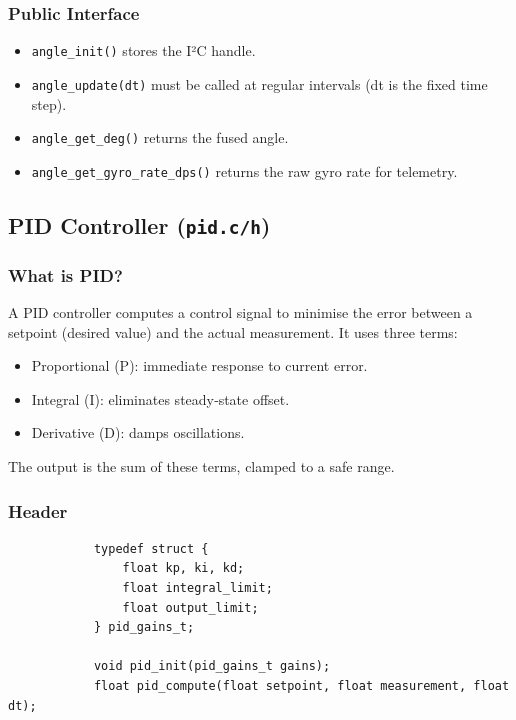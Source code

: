 \documentclass[12pt,a4paper]{article}
\begin{document}
		\subsubsection{Public Interface}
		\begin{itemize}
			\item \texttt{angle\_init()} stores the I²C handle.
			\item \texttt{angle\_update(dt)} must be called at regular intervals (dt is the fixed time step).
			\item \texttt{angle\_get\_deg()} returns the fused angle.
			\item \texttt{angle\_get\_gyro\_rate\_dps()} returns the raw gyro rate for telemetry.
		\end{itemize}
		
		\subsection{PID Controller (\texttt{pid.c/h})}
		\subsubsection{What is PID?}
		A PID controller computes a control signal to minimise the error between a setpoint (desired value) and the actual measurement. It uses three terms:
		\begin{itemize}
			\item Proportional (P): immediate response to current error.
			\item Integral (I): eliminates steady‑state offset.
			\item Derivative (D): damps oscillations.
		\end{itemize}
		The output is the sum of these terms, clamped to a safe range.
		
		\subsubsection{Header}
		\begin{lstlisting}
			typedef struct {
				float kp, ki, kd;
				float integral_limit;
				float output_limit;
			} pid_gains_t;
			
			void pid_init(pid_gains_t gains);
			float pid_compute(float setpoint, float measurement, float dt);
		\end{lstlisting}
		
\end{document}
